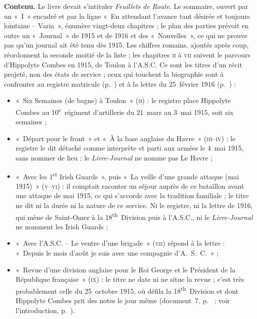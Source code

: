 \textbf{Contenu.} Le livre devait s'intituler \textit{Feuillets de Route}. Le sommaire, ouvert par un «~I~» encadré et par la ligne «~En attendant l'avance tant désirée et toujours lointaine – Varia~», énumère vingt-deux chapitres ; le plan des parties prévoit en outre un «~Journal~» de 1915 et de 1916 et des «~Nouvelles~», ce qui ne prouve pas qu'un journal ait été tenu dès 1915. Les chiffres romains, ajoutés après coup, réordonnent la seconde moitié de la liste ; les chapitres \textsc{ii} à \textsc{vii} suivent le parcours d'Hippolyte Combes en 1915, de Toulon à l'A.S.C. Ce sont les titres d'un récit projeté, non des états de service ; ceux qui touchent la biographie sont à confronter au registre matricule (p.~\pageref{annexe-services}) et à la lettre du 25~février 1916 (p.~\pageref{annexe:doc1}) :
\begin{itemize}[nosep,leftmargin=1.2em]
\item «~Six Semaines (de bagne) à Toulon~» (\textsc{ii}) : le registre place Hippolyte Combes au 10\textsuperscript{e}~régiment d'artillerie du 21~mars au 3~mai 1915, soit six semaines ;
\item «~Départ pour le front~» et «~À la base anglaise du Havre~» (\textsc{iii}--\textsc{iv}) : le registre le dit détaché comme interprète et parti aux armées le 4~mai 1915, sans nommer de lieu ; le \textit{Livre-Journal} ne nomme pas Le Havre ;
\item «~Avec les 1\textsuperscript{st} Irish Guards~», puis «~La veille d'une grande attaque (mai 1915)~» (\textsc{v}--\textsc{vi}) : il comptait raconter un séjour auprès de ce bataillon avant une attaque de mai 1915, ce qui s'accorde avec la tradition familiale ; le titre ne dit ni la durée ni la nature de ce service. Ni le registre, ni la lettre de 1916, qui mène de Saint-Omer à la 18\textsuperscript{th}~Division puis à l'A.S.C., ni le \textit{Livre-Journal} ne nomment les Irish Guards ;
\item «~Avec l'A.S.C. – Le ventre d'une brigade~» (\textsc{vii}) répond à la lettre : «~Depuis le mois d'août je suis avec une compagnie d'A.~S.~C.~» ;
\item «~Revue d'une division anglaise pour le Roi George et le Président de la République française~» (\textsc{ix}) : le titre ne date ni ne situe la revue ; c'est très probablement celle du 25~octobre 1915, où défila la 18\textsuperscript{th}~Division et dont Hippolyte Combes prit des notes le jour même (document~7, p.~\pageref{annexe:doc7} ; voir l'introduction, p.~\pageref{intro:revue}).
\end{itemize}

